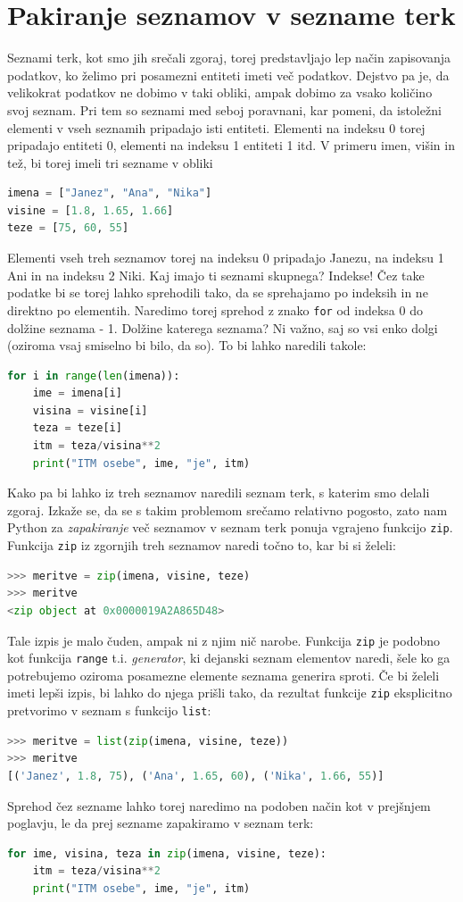 \section{Pakiranje seznamov v sezname terk}
Seznami terk, kot smo jih srečali zgoraj, torej predstavljajo lep način zapisovanja podatkov, ko želimo pri posamezni entiteti imeti več podatkov. Dejstvo pa je, da velikokrat podatkov ne dobimo v taki obliki, ampak dobimo za vsako količino svoj seznam. Pri tem so seznami med seboj poravnani, kar pomeni, da istoležni elementi v vseh seznamih pripadajo isti entiteti. Elementi na indeksu 0 torej pripadajo entiteti 0, elementi na indeksu 1 entiteti 1 itd. V primeru imen, višin in tež, bi torej imeli tri sezname v obliki 
\begin{lstlisting}[language=Python]
imena = ["Janez", "Ana", "Nika"]
visine = [1.8, 1.65, 1.66]
teze = [75, 60, 55]
\end{lstlisting}
Elementi vseh treh seznamov torej na indeksu 0 pripadajo Janezu, na indeksu 1 Ani in na indeksu 2 Niki. Kaj imajo ti seznami skupnega? Indekse! Čez take podatke bi se torej lahko sprehodili tako, da se sprehajamo po indeksih in ne direktno po elementih. Naredimo torej sprehod z znako \texttt{for} od indeksa 0 do dolžine seznama - 1. Dolžine katerega seznama? Ni važno, saj so vsi enko dolgi (oziroma vsaj smiselno bi bilo, da so). To bi lahko naredili takole:  
\begin{lstlisting}[language=Python]
for i in range(len(imena)):
    ime = imena[i]
    visina = visine[i]
    teza = teze[i]
    itm = teza/visina**2
    print("ITM osebe", ime, "je", itm)
\end{lstlisting}
Kako pa bi lahko iz treh seznamov naredili seznam terk, s katerim smo delali zgoraj. Izkaže se, da se s takim problemom srečamo relativno pogosto, zato nam Python za \emph{zapakiranje} več seznamov v seznam terk ponuja vgrajeno funkcijo \texttt{zip}. Funkcija \texttt{zip} iz zgornjih treh seznamov naredi točno to, kar bi si želeli: 
\begin{lstlisting}[language=Python]
>>> meritve = zip(imena, visine, teze)
>>> meritve
<zip object at 0x0000019A2A865D48>
\end{lstlisting}
Tale izpis je malo čuden, ampak ni z njim nič narobe. Funkcija \texttt{zip} je podobno kot funkcija \texttt{range} t.i. \emph{generator}, ki dejanski seznam elementov naredi, šele ko ga potrebujemo oziroma posamezne elemente seznama generira sproti. Če bi želeli imeti lepši izpis, bi lahko do njega prišli tako, da rezultat funkcije \texttt{zip} eksplicitno pretvorimo v seznam s funkcijo \texttt{list}:
\begin{lstlisting}[language=Python]
>>> meritve = list(zip(imena, visine, teze))
>>> meritve
[('Janez', 1.8, 75), ('Ana', 1.65, 60), ('Nika', 1.66, 55)]
\end{lstlisting}
Sprehod čez sezname lahko torej naredimo na podoben način kot v prejšnjem poglavju, le da prej sezname zapakiramo v seznam terk:
\begin{lstlisting}[language=Python]
for ime, visina, teza in zip(imena, visine, teze):
    itm = teza/visina**2
    print("ITM osebe", ime, "je", itm)
\end{lstlisting}

